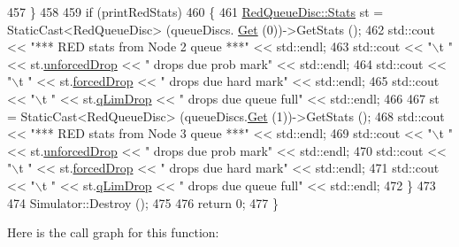 \begin{DoxyCode}
457     \}
458 
459   \textcolor{keywordflow}{if} (printRedStats)
460     \{
461       \hyperlink{structns3_1_1RedQueueDisc_1_1Stats}{RedQueueDisc::Stats} st = StaticCast<RedQueueDisc> (queueDiscs.
      \hyperlink{classns3_1_1QueueDiscContainer_a236064f6321b5f0d32561bb2a14e74af}{Get} (0))->GetStats ();
462       std::cout << \textcolor{stringliteral}{"*** RED stats from Node 2 queue ***"} << std::endl;
463       std::cout << \textcolor{stringliteral}{"\(\backslash\)t "} << st.\hyperlink{structns3_1_1RedQueueDisc_1_1Stats_a242027f6eb7d30e2cd636c52080e2c73}{unforcedDrop} << \textcolor{stringliteral}{" drops due prob mark"} << std::endl;
464       std::cout << \textcolor{stringliteral}{"\(\backslash\)t "} << st.\hyperlink{structns3_1_1RedQueueDisc_1_1Stats_a56951fa215564c8d2e59aa046dc3e494}{forcedDrop} << \textcolor{stringliteral}{" drops due hard mark"} << std::endl;
465       std::cout << \textcolor{stringliteral}{"\(\backslash\)t "} << st.\hyperlink{structns3_1_1RedQueueDisc_1_1Stats_a2374b8b8386ad6e42435bf1b29109bad}{qLimDrop} << \textcolor{stringliteral}{" drops due queue full"} << std::endl;
466 
467       st = StaticCast<RedQueueDisc> (queueDiscs.\hyperlink{classns3_1_1QueueDiscContainer_a236064f6321b5f0d32561bb2a14e74af}{Get} (1))->GetStats ();
468       std::cout << \textcolor{stringliteral}{"*** RED stats from Node 3 queue ***"} << std::endl;
469       std::cout << \textcolor{stringliteral}{"\(\backslash\)t "} << st.\hyperlink{structns3_1_1RedQueueDisc_1_1Stats_a242027f6eb7d30e2cd636c52080e2c73}{unforcedDrop} << \textcolor{stringliteral}{" drops due prob mark"} << std::endl;
470       std::cout << \textcolor{stringliteral}{"\(\backslash\)t "} << st.\hyperlink{structns3_1_1RedQueueDisc_1_1Stats_a56951fa215564c8d2e59aa046dc3e494}{forcedDrop} << \textcolor{stringliteral}{" drops due hard mark"} << std::endl;
471       std::cout << \textcolor{stringliteral}{"\(\backslash\)t "} << st.\hyperlink{structns3_1_1RedQueueDisc_1_1Stats_a2374b8b8386ad6e42435bf1b29109bad}{qLimDrop} << \textcolor{stringliteral}{" drops due queue full"} << std::endl;
472     \}
473 
474   Simulator::Destroy ();
475 
476   \textcolor{keywordflow}{return} 0;
477 \}
\end{DoxyCode}


Here is the call graph for this function\+:


